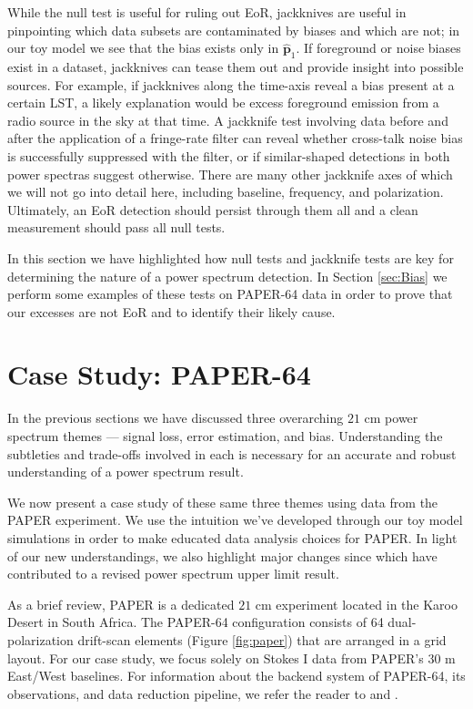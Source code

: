 \documentclass[preprint2,numberedappendix,tighten]{aastex6}  %
\begin{document}
While the null test is useful for ruling out EoR, jackknives are useful in pinpointing which data subsets are contaminated by biases and which are not; in our toy model we see that the bias exists only in $\hat{\textbf{p}}_{1}$. If foreground or noise biases exist in a dataset, jackknives can tease them out and provide insight into possible sources. For example, if jackknives along the time-axis reveal a bias present at a certain LST, a likely explanation would be excess foreground emission from a radio source in the sky at that time. A jackknife test involving data before and after the application of a fringe-rate filter can reveal whether cross-talk noise bias is successfully suppressed with the filter, or if similar-shaped detections in both power spectras suggest otherwise. There are many other jackknife axes of which we will not go into detail here, including baseline, frequency, and polarization. Ultimately, an EoR detection should persist through them all and a clean measurement should pass all null tests. 

In this section we have highlighted how null tests and jackknife tests are key for determining the nature of a power spectrum detection. In Section \ref{sec:Bias} we perform some examples of these tests on PAPER-64 data in order to prove that our excesses are not EoR and to identify their likely cause. 


\section{Case Study: PAPER-64}
\label{sec:CaseStudy}

In the previous sections we have discussed three overarching $21$ cm power spectrum themes --- signal loss, error estimation, and bias. Understanding the subtleties and trade-offs involved in each is necessary for an accurate and robust understanding of a power spectrum result. 

We now present a case study of these same three themes using data from the PAPER experiment. We use the intuition we've developed through our toy model simulations in order to make educated data analysis choices for PAPER. In light of our new understandings, we also highlight major changes since \citet{ali_et_al2015} which have contributed to a revised power spectrum upper limit result.

As a brief review, PAPER is a dedicated $21$ cm experiment located in the Karoo Desert in South Africa. The PAPER-64 configuration consists of 64 dual-polarization drift-scan elements (Figure \ref{fig:paper}) that are arranged in a grid layout. For our case study, we focus solely on Stokes I data from PAPER's $30$ m East/West baselines. For information about the backend system of PAPER-64, its observations, and data reduction pipeline, we refer the reader to \citet{parsons_et_al2010} and \citet{ali_et_al2015}.
\end{document}
